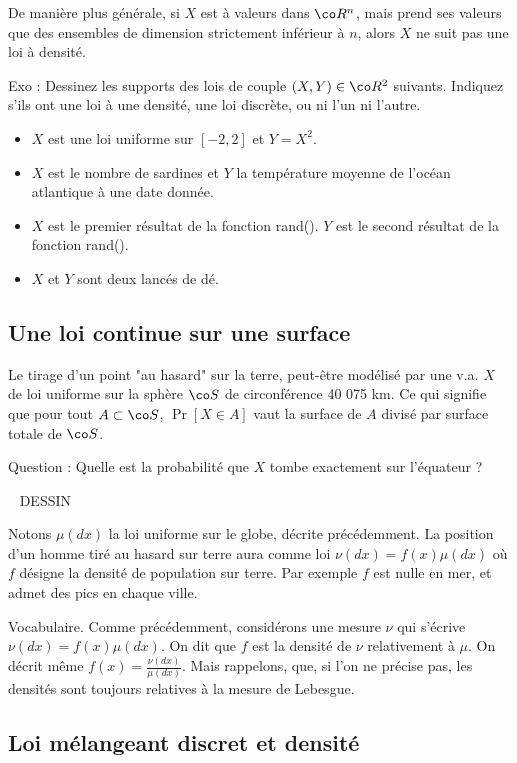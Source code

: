 \documentclass{article}
\def\dessin{\ \linebreak \vspace{0.5cm}  \linebreak  DESSIN  \vspace{1cm} \ \linebreak   }
\begin{document}
 De manière plus générale, si $X$ est à valeurs dans $\co R^n$, mais  prend ses valeurs que des  ensembles de dimension strictement inférieur à $n$,  alors $X$ ne suit pas une loi à densité. 

Exo : Dessinez les supports des lois de couple $(X,Y)\in \co R^2$ suivants. Indiquez s'ils  ont une loi à une densité, une loi discrète,   ou ni l'un ni l'autre. 
\begin{itemize}
\item $X$ est une loi uniforme sur $[-2,2]$ et $Y=X^2$. 
\item $X$ est le nombre de sardines et $Y$ la température moyenne de l'océan atlantique à une date donnée. 
\item $X$ est le premier résultat de la fonction rand(). $Y$ est le second résultat de la fonction rand().
\item $X$ et $Y$ sont deux lancés de dé.  
\end{itemize}
 


\subsection{Une loi continue sur une surface}

Le tirage d'un point "au hasard" sur la terre, peut-être modélisé par une v.a. $X$ de loi uniforme sur la sphère $\co S$ de circonférence 40 075 km.  
 Ce qui signifie que pour tout $A \subset \co S$, $\Pr[X\in A]$   vaut la surface de $A$ divisé par surface totale de $\co S$.   

Question : Quelle est la probabilité que $X$ tombe exactement sur l'équateur ?  

\dessin

Notons $\mu(dx)$ la loi uniforme sur le globe, décrite précédemment. La position d'un homme tiré au hasard sur terre aura comme loi $\nu(dx)= f(x) \mu(dx)$ où $f$ désigne la densité de population sur terre.  Par exemple $f$ est nulle en mer, et admet des pics en chaque ville. 


Vocabulaire. Comme précédemment, considérons une mesure $\nu$ qui s'écrive $\nu(dx) = f(x) \mu(dx)$. On dit que $f$ est la densité de $\nu$ relativement à $\mu$. On décrit même $f(x) = \frac {\nu(dx)}{\mu(dx)}$. Mais rappelons, que, si l'on ne précise pas, les densités sont toujours relatives à la mesure de Lebesgue.  




\subsection{Loi mélangeant  discret et densité}
\end{document}
